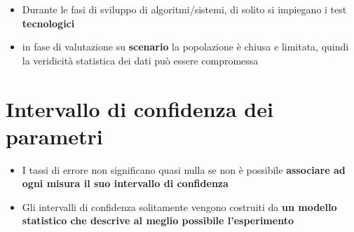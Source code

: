 \documentclass{report}
\begin{document}
\begin{itemize}
    \item Durante le fasi di sviluppo di algoritmi/sistemi, di solito si 
    impiegano i test \textbf{tecnologici}
    \item in fase di valutazione su \textbf{scenario} la popolazione è 
    chiusa e limitata, quindi la veridicità statistica dei dati può essere 
    compromessa 
\end{itemize}

\section{Intervallo di confidenza dei parametri}
\begin{itemize}
    \item I tassi di errore non significano quasi nulla se non è possibile \textbf{
        associare ad ogni misura il suo intervallo di confidenza}
    \item Gli intervalli di confidenza solitamente vengono costruiti da 
    \textbf{un modello statistico che descrive al meglio possibile l'esperimento}
\end{itemize}
\end{document}
